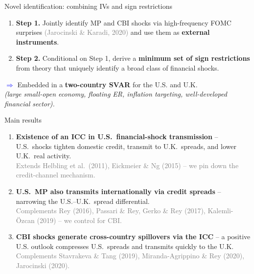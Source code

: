 \documentclass[10pt]{beamer}
\begin{document}
\begin{frame}{Novel identification: combining IVs and sign restrictions}
\begin{enumerate}
    \item \textbf{Step 1.} Jointly identify MP and CBI shocks via high-frequency FOMC surprises \textcolor{gray}{\scriptsize(Jarocinski \& Karadi, 2020)} and use them as \textbf{external instruments}.
    \vspace{0.4em}
    \item \textbf{Step 2.} Conditional on Step 1, derive a \textbf{minimum set of sign restrictions} from theory that uniquely identify a broad class of financial shocks.
\end{enumerate}
\vspace{0.6em}
\pause
\textcolor{blue}{$\boldsymbol{\Rightarrow}$} Embedded in a \textbf{two-country SVAR} for the U.S. and U.K.\\
\textit{(large small-open economy, floating ER, inflation targeting, well-developed financial sector).}
\end{frame}


\begin{frame}{Main results}
\begin{enumerate}
    \item \textbf{Existence of an ICC in U.S.\ financial-shock transmission} -- U.S.\ shocks tighten domestic credit, transmit to U.K.\ spreads, and lower U.K.\ real activity.\\
    {\scriptsize\textcolor{gray}{Extends Helbling et al.\ (2011), Eickmeier \& Ng (2015) -- we pin down the credit-channel mechanism.}}
    \vspace{0.3em}
    \item \textbf{U.S.\ MP also transmits internationally via credit spreads} -- narrowing the U.S.--U.K.\ spread differential.\\
    {\scriptsize\textcolor{gray}{Complements Rey (2016), Passari \& Rey, Gerko \& Rey (2017), Kalemli-\"Ozcan (2019) -- we control for CBI.}}
    \vspace{0.3em}
    \item \textbf{CBI shocks generate cross-country spillovers via the ICC} -- a positive U.S. outlook compresses U.S.\ spreads and transmits quickly to the U.K.\\
    {\scriptsize\textcolor{gray}{Complements Stavrakeva \& Tang (2019), Miranda-Agrippino \& Rey (2020), Jarocinski (2020).}}
\end{enumerate}
\end{frame}
\end{document}
